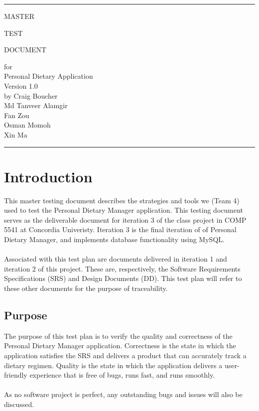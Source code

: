 \documentclass[table]{scrreprt}
\date{}
\def\myversion{1.0}
\begin{document}
    \begin{titlepage}
        \flushright\bfseries\huge
        \rule{\linewidth}{5pt}
        \par
        \vspace{1cm}
        {\Huge MASTER \par TEST \par DOCUMENT \par}
        \vspace{2cm}
        for \\
        \vspace{2cm}
        Personal Dietary Application \\
        \vspace{2cm}
        \LARGE{Version \myversion \\}
        \vspace{2cm}
        by Craig Boucher \\
        Md Tanveer Alamgir \\
        Fan Zou\\
        Osman Momoh \\
        Xin Ma
        \vspace{2cm}
        \rule{\linewidth}{5pt}
    \end{titlepage}

    \tableofcontents

    \chapter{Introduction}
    This master testing document describes the strategies and tools we (Team 4) used to test the Personal Dietary Manager application. This testing document serves as the deliverable document for iteration 3 of the class project in COMP 5541 at Concordia Univeristy. Iteration 3 is the final iteration of of Personal Dietary Manager, and implements database functionality using MySQL. \\ \\
    Associated with this test plan are documents delivered in iteration 1 and iteration 2 of this project. These are, respectively, the Software Requirements Specifications (SRS) and Design Documents (DD). This test plan will refer to these other documents for the purpose of traceability.

    \section{Purpose}
    The purpose of this test plan is to verify the quality and correctness of the Personal Dietary Manager application. Correctness is the state in which the application satisfies the SRS and delivers a product that can accurately track a dietary regimen. Quality is the state in which the application delivers a user-friendly experience that is free of bugs, runs fast, and runs smoothly. \\\\
    As no software project is perfect, any outstanding bugs and issues will also be discussed.
\end{document}
